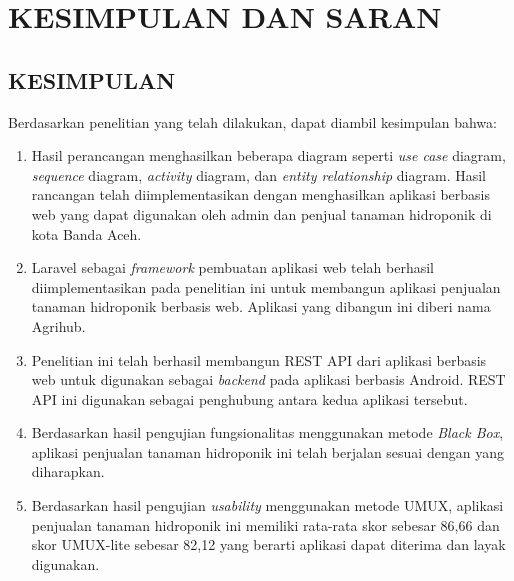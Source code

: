 \fancyhf{} 
\fancyfoot[C]{\thepage}
\chapter{KESIMPULAN DAN SARAN}

\section{\uppercase{KESIMPULAN}}
Berdasarkan penelitian yang telah dilakukan, dapat diambil kesimpulan bahwa:
\begin{enumerate}
    \item Hasil perancangan menghasilkan beberapa diagram seperti \textit{use case} diagram, \textit{sequence} diagram, \textit{activity} diagram, dan \textit{entity relationship} diagram. Hasil rancangan telah diimplementasikan dengan menghasilkan aplikasi berbasis web yang dapat digunakan oleh admin dan penjual tanaman hidroponik di kota Banda Aceh.
    \item Laravel sebagai \textit{framework} pembuatan aplikasi web telah berhasil diimplementasikan pada penelitian ini untuk membangun aplikasi penjualan tanaman hidroponik berbasis web. Aplikasi yang dibangun ini diberi nama Agrihub.
    \item Penelitian ini telah berhasil membangun REST API dari aplikasi berbasis web untuk digunakan sebagai \textit{backend} pada aplikasi berbasis Android. REST API ini digunakan sebagai penghubung antara kedua aplikasi tersebut.
    \item Berdasarkan hasil pengujian fungsionalitas menggunakan metode \textit{Black Box}, aplikasi penjualan tanaman hidroponik ini telah berjalan sesuai dengan yang diharapkan.
    \item Berdasarkan hasil pengujian \textit{usability} menggunakan metode UMUX, aplikasi penjualan tanaman hidroponik ini memiliki rata-rata skor sebesar 86,66 dan skor UMUX-lite sebesar 82,12 yang berarti aplikasi dapat diterima dan layak digunakan.
\end{enumerate}

